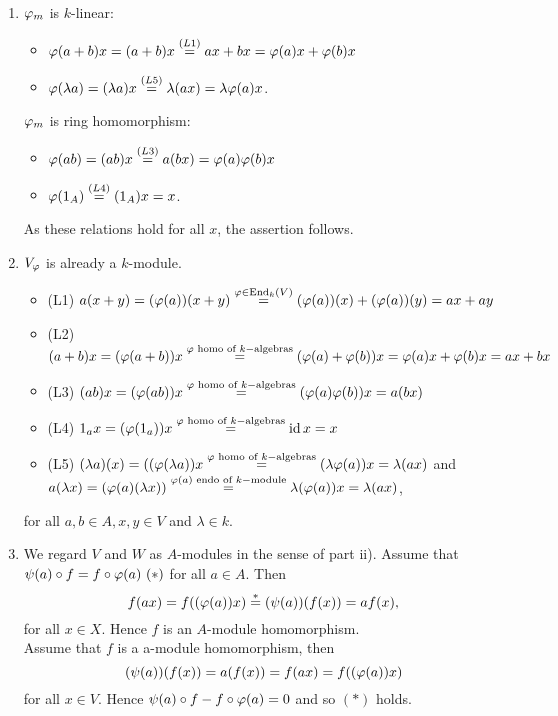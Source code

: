 \begin{sol}
  \begin{enumerate}
    \item $\varphi_m$ is $k$-linear:
    \begin{itemize}
      \item $\varphi(a+b)x=(a+b)x\overset{(L1)}{=}ax+bx=\varphi(a)x+\varphi(b)x$
      \item $\varphi(\lambda a)=(\lambda a)x\overset{(L5)}{=}\lambda(ax)=\lambda\varphi(a)x$.
    \end{itemize}
    $\varphi_m$ is ring homomorphism:
    \begin{itemize}
      \item $\varphi(ab)=(ab)x\overset{(L3)}{=}a(bx)=\varphi(a)\varphi(b)x$
      \item $\varphi(1_A)\overset{(L4)}{=}(1_A)x=x$.
    \end{itemize}
    As these relations hold for all $x$, the assertion follows.
    \item $V_{\varphi}$ is already a $k$-module.
    \begin{itemize}
      \item (L1) $a(x+y)=(\varphi(a))(x+y)\overset{\varphi \in \operatorname{End}_k(V)}{=}(\varphi(a))(x)+(\varphi(a))(y) = ax+ay$
      \item (L2) $(a+b)x=(\varphi(a+b))x\overset{\varphi\text{ homo of } k-\text{algebras}}{=}(\varphi(a)+\varphi(b))x=\varphi(a)x+\varphi(b)x=ax+bx$
      \item (L3) $(ab)x=(\varphi(ab))x\overset{\varphi\text{ homo of } k-\text{algebras}}{=}(\varphi(a)\varphi(b))x=a(bx)$
      \item (L4) $1_ax=(\varphi(1_a))x\overset{\varphi\text{ homo of } k-\text{algebras}}{=}\operatorname{id} x=x$
      \item (L5) $(\lambda a)(x)=((\varphi(\lambda a))x\overset{\varphi\text{ homo of } k-\text{algebras}}{=} (\lambda\varphi(a))x=\lambda(ax)$ and \\$a(\lambda x)=(\varphi(a)(\lambda x))\overset{\varphi(a)\text{ endo of } k-\text{module}}{=}\lambda (\varphi(a))x=\lambda (ax)$,
    \end{itemize}
    for all $a,b\in A,x,y\in V$ and $\lambda \in k$.
    \item We regard $V$ and $W$ as $A$-modules in the sense of part ii). Assume that $\psi(a)\circ f=f\circ \varphi(a)~(\ast)$ for all $a\in A$. Then
    \[
    f(ax)=f((\varphi(a))x)\overset{\ast}{=}(\psi(a))(f(x))=af(x),
    \]
    for all $x\in X$.
    Hence $f$ is an $A$-module homomorphism.\\
    Assume that $f$ is a a-module homomorphism, then
    \[
    (\psi(a))(f(x))=a(f(x))=f(ax)=f((\varphi(a))x)\]
    for all $x\in V$. Hence $\psi(a)\circ f - f\circ \varphi(a)=0$ and so $(\ast)$ holds.
  \end{enumerate}
\end{sol}

